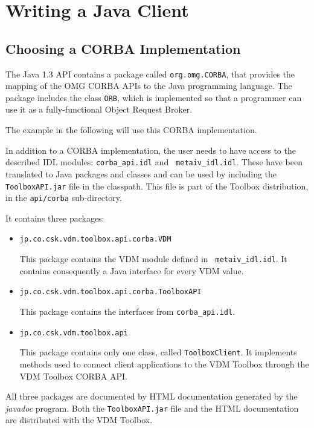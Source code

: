 \documentclass[\pformat,12pt]{article}
\begin{document}
\newpage
\section{Writing a Java Client}
\label{writingajavaclient}

\subsection{Choosing a CORBA Implementation}

The Java 1.3 API contains a package called {\tt org.omg.CORBA}, that
provides the mapping of the OMG CORBA APIs to the Java programming
language. The package includes the class {\tt ORB}, which is
implemented so that a programmer can use it as a fully-functional
Object Request Broker. 

The example in the following will use this CORBA implementation. 

In addition to a CORBA implementation, the user needs to have access
to the described IDL modules: {\tt corba\_api.idl} and {\tt
  metaiv\_idl.idl}. These have been translated to Java packages and
classes and can be used by including the {\tt ToolboxAPI.jar} file in
the classpath. This file is part of the Toolbox distribution, in the
\verb+api/corba+ sub-directory. 

It contains three packages:

\begin{itemize}
\item  {\tt jp.co.csk.vdm.toolbox.api.corba.VDM}
  
  This package contains the VDM module defined in {\tt
    metaiv\_idl.idl}. It contains
  consequently a Java interface for every VDM value.

\item {\tt jp.co.csk.vdm.toolbox.api.corba.ToolboxAPI} 
  
  This package contains the interfaces from {\tt corba\_api.idl}.

\item {\tt jp.co.csk.vdm.toolbox.api} 
  
  This package contains only one class, called {\tt ToolboxClient}. It
  implements methods used to connect client applications to the
  VDM Toolbox through the VDM Toolbox CORBA API. 
\end{itemize}

All three packages are documented by HTML documentation generated by
the {\em javadoc} program. Both the {\tt ToolboxAPI.jar} file and the
HTML documentation are distributed with the VDM Toolbox. 
\end{document}
